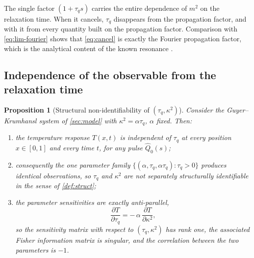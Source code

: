\documentclass[preprint,12pt,a4paper]{elsarticle}
\theoremstyle{plain}
\newtheorem{proposition}{Proposition}
\theoremstyle{definition}
\theoremstyle{remark}
\newcommand{\tq}{\tau_{q}}
\newcommand{\kk}{\kappa^{2}}
\begin{document}
The single factor $(1+\tq s)$ carries the entire dependence of $m^{2}$ on the
relaxation time. When it cancels, $\tq$ disappears from the propagation factor,
and with it from every quantity built on the propagation factor. Comparison
with \eqref{eq:lim-fourier} shows that \eqref{eq:cancel} is exactly the Fourier
propagation factor, which is the analytical content of the known resonance
\cite{FulopKovacsVan2015,Kovacs2018,Fulop2018entropy}.

\subsection{Independence of the observable from the relaxation time}
\label{sec:struct-indep}

\begin{proposition}[Structural non-identifiability of $(\tq,\kk)$]
\label{prop:main}
Consider the Guyer--Krumhansl system of \cref{sec:model} with
$\kk = \alpha\tq$, $\alpha$ fixed. Then:
\begin{enumerate}
  \item the temperature response $T(x,t)$ is independent of $\tq$ at every
        position $x \in [0,1]$ and every time $t$, for any pulse
        $\hat{Q}_{0}(s)$;
  \item consequently the one parameter family
        $\{(\alpha, \tq, \alpha\tq) : \tq > 0\}$ produces identical
        observations, so $\tq$ and $\kk$ are not separately structurally
        identifiable in the sense of \cref{def:struct};
  \item the parameter sensitivities are exactly anti-parallel,
        \begin{equation}
          \frac{\partial T}{\partial \tq}
          = -\,\alpha\, \frac{\partial T}{\partial \kk} ,
          \label{eq:antiparallel}
        \end{equation}
        so the sensitivity matrix with respect to $(\tq,\kk)$ has rank one,
        the associated Fisher information matrix is singular, and the
        correlation between the two parameters is $-1$.
\end{enumerate}
\end{proposition}
\end{document}
